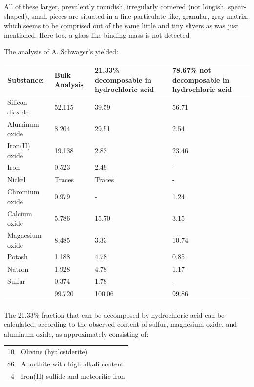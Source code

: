 \documentclass[a4paper, 12pt, oneside]{article}
\begin{document}
\paragraph*{}
All of these larger, prevalently roundish, irregularly cornered (not longish, spear-shaped), small pieces are situated in a fine particulate-like, granular, gray matrix, which seems to be comprised out of the same little and tiny slivers as was just mentioned. Here too, a glass-like binding mass is not detected.

The analysis of A. Schwager's yielded:
\begin{center}
    \begin{tabular}{|l|p{1.75cm}|p{3.2cm}|p{2.7cm}|}
        \hline
        Substance: & Bulk Analysis & 21.33\% decomposable in hydrochloric acid & 78.67\% not decomposable in hydrochloric acid\\\hline
        Silicon dioxide & 52.115 & 39.59 & 56.71\\\hline
        Aluminum oxide & 8.204 & 29.51 & 2.54\\\hline
        Iron(II) oxide & 19.138 & 2.83 & 23.46\\\hline
        Iron & 0.523 & 2.49 & -\\\hline
        Nickel & Traces & Traces & -\\\hline
        Chromium oxide & 0.979 & - & 1.24\\\hline
        Calcium oxide & 5.786 & 15.70 & 3.15\\\hline
        Magnesium oxide & 8,485 & 3.33 & 10.74\\\hline
        Potash & 1.188 & 4.78 & 0.85\\\hline
        Natron & 1.928 & 4.78 & 1.17\\\hline
        Sulfur & 0.374 & 1.78 & -\\\hline
        & 99.720 & 100.06 & 99.86\\
        \hline
    \end{tabular}
\end{center}
\paragraph*{}
The 21.33\% fraction that can be decomposed by hydrochloric acid can be calculated, according to the observed content of sulfur, magnesium oxide, and aluminum oxide, as approximately consisting of:
\begin{center}
    \begin{tabular}{r l}
        10 & Olivine (hyalosiderite)\\
        86 & Anorthite with high alkali content\\
        4 & Iron(II) sulfide and meteoritic iron\\
    \end{tabular}
\end{center}
\end{document}
